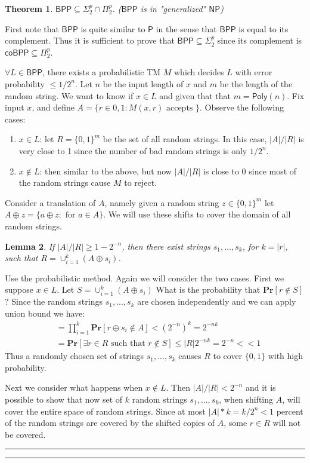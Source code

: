 \documentclass[twoside]{article}
\newcounter{lecnum}
\newtheorem{theorem}{Theorem}[lecnum]
\newtheorem{lemma}[theorem]{Lemma}
\newenvironment{proof}{{\bf Proof:}}{\hfill\rule{2mm}{2mm}}
\def\Pr{\mathbf{Pr}}
\def\P{\mathsf{P}}
\def\NP{\mathsf{NP}}
\def\BPP{\mathsf{BPP}}
\def\Poly{\mathsf{Poly}}
\begin{document}
\begin{theorem}
$\BPP \subseteq \Sigma_2^p \cap \Pi_2^p$. ($\BPP$ is in "generalized" $\NP$)
\end{theorem}
\begin{proof}
First note that $\BPP$ is quite similar to $\P$ in the sense that $\BPP$ is equal to its complement. Thus it is sufficient to prove that $\BPP \subseteq \Sigma_2^p$ since its complement is $\mathsf{coBPP} \subseteq \Pi_2^p$. 

$\forall L \in \BPP$, there exists a probabilistic TM $M$ which decides $L$ with error probability $\leq 1/2^n$. Let $n$ be the input length of $x$ and $m$ be the length of the random string. We want to know if $x \in L$ and given that that $m = \Poly (n)$. Fix input $x$, and define $A = \{r \in {0,1}: M(x,r) \mbox{ accepts }\}$. Observe the following cases:
\begin{enumerate}
\item $x \in L$: let $R = \{0,1\}^m$ be the set of all random strings. In this case, $|A|/|R|$ is very close to 1 since the number of bad random strings is only $1/2^n$.
\item $x \notin L$: then similar to the above, but now $|A|/|R|$ is close to 0 since most of the random strings cause $M$ to reject. 
\end{enumerate} 

Consider a translation of $A$, namely given a random string $z \in \{0,1\}^m$ let $A \oplus z = \{a \oplus z: \mbox{ for } a \in A\}$. We will use these shifts to cover the domain of all random strings.

\begin{lemma}
If $|A|/|R| \geq 1 - 2^{-n}$, then there exist strings $s_1, ..., s_k$, for $k = |r|$, such that $R = \cup_{i=1}^k (A \oplus s_i)$.
\end{lemma}
\begin{proof}
Use the probabilistic method. Again we will consider the two cases. First we suppose $x \in L$. Let $S = \cup_{i=1}^k (A \oplus s_i)$ What is the probability that $\Pr[r \notin S]$? Since the random strings $s_1, ..., s_k$ are chosen independently and we can apply union bound we have:
\begin{align*}
&= \prod_{i=1}^{k}\Pr[r \oplus s_i \notin A] < (2^{-n})^k = 2^{-nk} \\
&= \Pr[\exists r \in R \mbox{ such that } r \notin S] \leq |R|2^{-nk} = 2^{-n} << 1
\end{align*} 
Thus a randomly chosen set of strings $s_1, ..., s_k$ causes $R$ to cover $\{0,1\}$ with high probability.

Next we consider what happens when $x \notin L$. Then $|A| / |R| < 2^{-n}$ and it is possible to show that now set of $k$ random strings $s_1, ..., s_k$, when shifting $A$, will cover the entire space of random strings. Since at most $|A| * k = k / 2^n < 1$ percent of the random strings are covered by the shifted copies of $A$, some $r \in R$ will not be covered.
\end{proof}

\end{proof}
\end{document}
